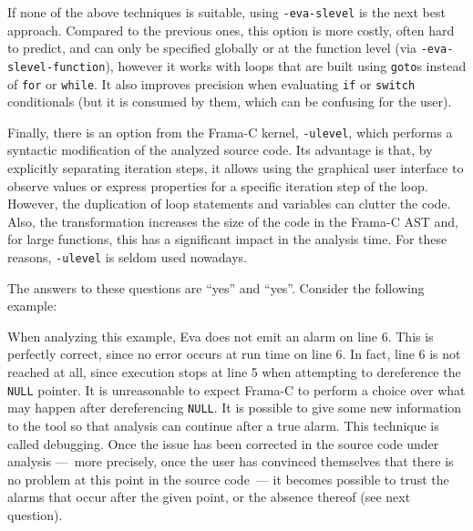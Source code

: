 \documentclass[web]{frama-c-book}
\newcommand{\Eva}{\textsf{Eva}}
\begin{document}
If none of the above techniques is suitable, using \lstinline|-eva-slevel|
is the next best approach. Compared to the previous ones, this option is more
costly, often hard to predict, and can only be specified globally or at the
function level (via \lstinline|-eva-slevel-function|), however it works with
loops that are built using \lstinline|goto|s instead of \lstinline|for| or
\lstinline|while|. It also improves precision when evaluating \lstinline|if| or
\lstinline|switch| conditionals (but it is consumed by them, which can be
confusing for the user).

Finally, there is an option from the Frama-C kernel, \lstinline|-ulevel|,
which performs a syntactic modification of the analyzed source code.
Its advantage is that, by explicitly separating iteration steps,
it allows using the graphical user interface to observe values or express
properties for a specific iteration step of the loop.
However, the duplication of loop statements and variables can clutter the code.
Also, the transformation increases the size of the code in the Frama-C AST and,
for large functions, this has a significant impact in the analysis time.
For these reasons, \lstinline|-ulevel| is seldom used nowadays.



The answers to these questions are ``yes'' and ``yes''. 
Consider the following example:


When analyzing this example, \Eva{} does not emit an
alarm on line 6. This is perfectly correct, since no error occurs at
run time on line 6. In fact, line 6 is not reached at all, since
execution stops at line 5 when attempting to dereference
the \lstinline|NULL| pointer. It is unreasonable to expect Frama-C to
perform a choice over what may happen after dereferencing
\lstinline|NULL|. It is possible to give some new information to the tool
so that analysis can continue after a true alarm. This technique is called
debugging. Once the issue has been corrected in the source code under
analysis ---~more precisely, once the user has convinced themselves
that there is no problem at this point in the source code~--- it
becomes possible to trust the alarms that occur after the given point,
or the absence thereof (see next question).

\end{document}
